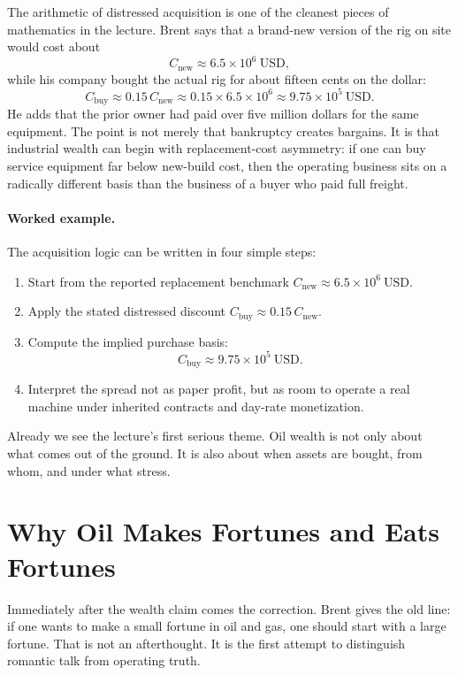 The arithmetic of distressed acquisition is one of the cleanest pieces of mathematics in the lecture. Brent says that a brand-new version of the rig on site would cost about
\begin{equation}
C_{\mathrm{new}} \approx 6.5 \times 10^6\ \mathrm{USD},
\end{equation}
while his company bought the actual rig for about fifteen cents on the dollar:
\begin{equation}
C_{\mathrm{buy}} \approx 0.15\,C_{\mathrm{new}} \approx 0.15 \times 6.5 \times 10^6 \approx 9.75 \times 10^5\ \mathrm{USD}.
\end{equation}
He adds that the prior owner had paid over five million dollars for the same equipment. The point is not merely that bankruptcy creates bargains. It is that industrial wealth can begin with replacement-cost asymmetry: if one can buy service equipment far below new-build cost, then the operating business sits on a radically different basis than the business of a buyer who paid full freight.

\paragraph{Worked example.} The acquisition logic can be written in four simple steps:
\begin{enumerate}
\item Start from the reported replacement benchmark \(C_{\mathrm{new}} \approx 6.5 \times 10^6\ \mathrm{USD}\).
\item Apply the stated distressed discount \(C_{\mathrm{buy}} \approx 0.15\,C_{\mathrm{new}}\).
\item Compute the implied purchase basis:
\[
C_{\mathrm{buy}} \approx 9.75 \times 10^5\ \mathrm{USD}.
\]
\item Interpret the spread not as paper profit, but as room to operate a real machine under inherited contracts and day-rate monetization.
\end{enumerate}

Already we see the lecture's first serious theme. Oil wealth is not only about what comes out of the ground. It is also about when assets are bought, from whom, and under what stress.

\section{Why Oil Makes Fortunes and Eats Fortunes}

Immediately after the wealth claim comes the correction. Brent gives the old line: if one wants to make a small fortune in oil and gas, one should start with a large fortune. That is not an afterthought. It is the first attempt to distinguish romantic talk from operating truth.

